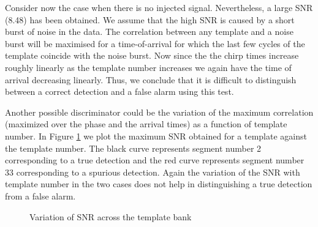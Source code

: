 Consider now the case when there is no injected signal.
Nevertheless, a large SNR (8.48) has been
obtained. We assume that the high SNR is caused by a
short burst of noise in the data.
The correlation between any template
and a noise burst will be maximised for a time-of-arrival for which
the last few cycles of the template coincide with the noise burst. 
Now since the the chirp times increase roughly linearly as the
template number increases we again have the time of arrival decreasing
linearly.
Thus, we conclude that it is  difficult to distinguish between a correct detection
and a false alarm using this test.

Another possible discriminator could be the variation of the maximum
correlation (maximized over the phase and the arrival times) as a
function of template number. 
In Figure \ref{f:snr-acrosstemplatebank} we plot the maximum SNR
obtained for a template against the template number. The 
black curve represents segment number 2 corresponding to a true
detection and the red curve represents segment number 33 corresponding
to a spurious detection. Again the variation of the SNR with template
number in the two cases does not help in distinguishing a  true
detection from a false alarm.  
\begin{figure}[hb]
\begin{center}
\caption{ \label{f:snr-acrosstemplatebank} Variation of SNR across the template bank}
\end{center}
\end{figure}



